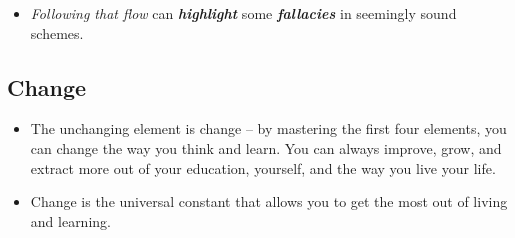 \documentclass[11pt]{article}
\begin{document}
\begin{itemize}
\begin{itemize}
\item \emph{Following that flow} can \emph{\textbf{highlight}} some \emph{\textbf{fallacies}} in seemingly sound schemes.
\end{itemize}
\end{itemize}


\subsection{Change}
\begin{itemize}
\item The unchanging element is change -- by mastering the first four elements, you can change the way you think and learn. You can always improve, grow, and extract more out of your education, yourself, and the way you live your life. 
\item Change is the universal constant that allows you to get the most out of living and learning.
\end{itemize}



\newpage
\end{document}
